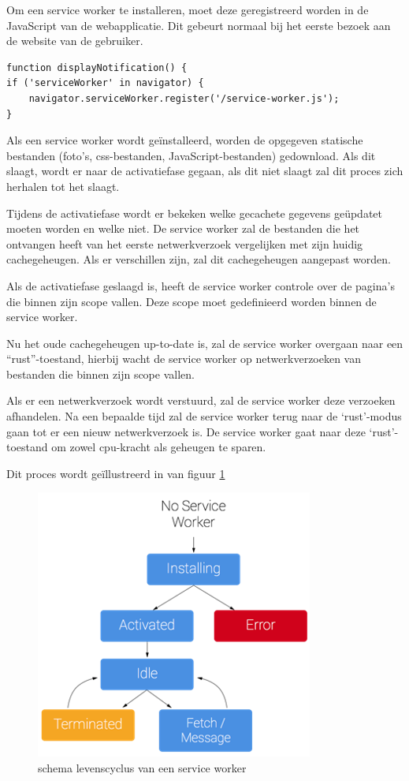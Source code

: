 			Om een service worker te installeren, moet deze geregistreerd worden in de JavaScript van de webapplicatie. Dit gebeurt normaal bij het eerste bezoek aan de website van de gebruiker.
			
\begin{lstlisting}
function displayNotification() {
if ('serviceWorker' in navigator) {
	navigator.serviceWorker.register('/service-worker.js');
}
\end{lstlisting}
	
		Als een service worker wordt geïnstalleerd, worden de opgegeven statische bestanden (foto’s, css-bestanden, JavaScript-bestanden) gedownload. Als dit slaagt, wordt er naar de activatiefase gegaan, als dit niet slaagt zal dit proces zich herhalen tot het slaagt. 
		
		Tijdens de activatiefase wordt er bekeken welke gecachete gegevens geüpdatet moeten worden en welke niet. De service worker zal de bestanden die het ontvangen heeft van het eerste netwerkverzoek vergelijken met zijn huidig cachegeheugen. Als er verschillen zijn, zal dit cachegeheugen aangepast worden.
		
		Als de activatiefase geslaagd is, heeft de service worker controle over de pagina's die binnen zijn scope vallen. Deze scope moet gedefinieerd worden binnen de service worker.
		
		Nu het oude cachegeheugen up-to-date is, zal de service worker overgaan naar een “rust”-toestand, hierbij wacht de service worker op netwerkverzoeken van bestanden die binnen zijn scope vallen.
		
		Als er een netwerkverzoek wordt verstuurd, zal de service worker deze verzoeken afhandelen. Na een bepaalde tijd zal de service worker terug naar de ‘rust’-modus gaan tot er een nieuw netwerkverzoek is. De service worker gaat naar deze ‘rust’-toestand om zowel cpu-kracht als geheugen te sparen.
		\autocite{Gaunt2019}
		
		Dit proces wordt geïllustreerd in van figuur \ref{fig:swLifeCycle}
		
		
		\begin{figure}[H]
			\centering
			\includegraphics{./img/ServiceWorkerLifeCycle.png}
			\caption{schema levenscyclus van een service worker \autocite{Gaunt2019}}
			\label{fig:swLifeCycle}
		\end{figure}
	


